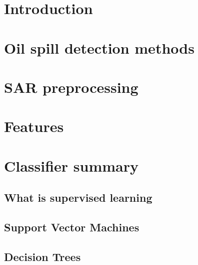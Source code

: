 \documentclass{article}
\begin{document}
\begin{multicols}{2} %

\section{Introduction}

  


\section{Oil spill detection methods}

	

\section{SAR preprocessing}

	

\section{Features}

	


\section{Classifier summary}

\subsection{What is supervised learning}

	

\subsection{Support Vector Machines}

	

\subsection{Decision Trees}


\end{multicols}
\end{document}
